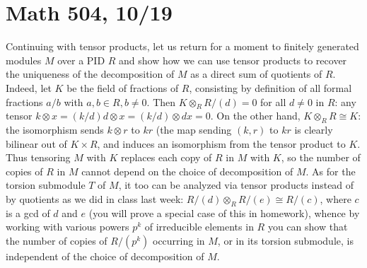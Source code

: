 \documentclass[10pt]{article}
\begin{document}
\section*{Math 504, 10/19}

Continuing with tensor products, let us return for a moment to finitely
generated modules $M$ over a PID $R$ and show how we can use tensor
products to recover the uniqueness of the decomposition of $M$ as a
direct sum of quotients of $R$. Indeed, let $K$ be the field of
fractions of $R$, consisting by definition of all formal fractions $a/b$
with $a,b\in R,b\ne0$. Then $K\otimes_R R/(d) = 0$ for all $d\ne0$ in
$R$: any tensor $k\otimes x = (k/d)d \otimes x = (k/d)\otimes dx = 0$.
On the other hand, $K\otimes_R R\cong K$: the isomorphism sends
$k\otimes r$ to $kr$ (the map sending $(k,r)$ to $kr$ is clearly
bilinear out of $K\times R$, and induces an isomorphism from the tensor
product to $K$. Thus tensoring $M$ with $K$ replaces each copy of $R$ in
$M$ with $K$, so the number of copies of $R$ in $M$ cannot depend on the
choice of decomposition of $M$. As for the torsion submodule $T$ of $M$,
it too can be analyzed via tensor products instead of by quotients as we
did in class last week: $R/(d)\otimes_R R/(e)\cong R/(c)$, where $c$ is
a gcd of $d$ and $e$ (you will prove a special case of this in
homework), whence by working with various powers $p^k$ of irreducible
elements in $R$ you can show that the number of copies of $R/(p^k)$
occurring in $M$, or in its torsion submodule, is independent of the
choice of decomposition of $M$.
\end{document}
